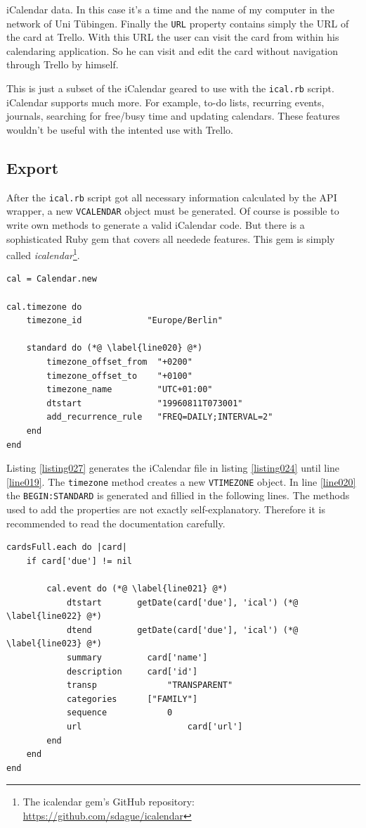 iCalendar data. In this case it's a time and the name of my computer in the network of Uni Tübingen. Finally the \lstinline{URL} property contains simply the URL of the card at Trello. With this URL the user can visit the card from within his calendaring application. So he can visit and edit the card without navigation through Trello by himself. \cite{ical:specs}

This is just a subset of the iCalendar geared to use with the \texttt{ical.rb} script. iCalendar supports much more. For example, to-do lists, recurring events, journals, searching for free/busy time and updating calendars. These features wouldn't be useful with the intented use with Trello. 

\subsection{Export}

After the \texttt{ical.rb} script got all necessary information calculated by the API wrapper, a new \lstinline{VCALENDAR} object must be generated. Of course is possible to write own methods to generate a valid iCalendar code. But there is a sophisticated Ruby gem that covers all needede features. This gem is simply called \emph{icalendar}\footnote{The icalendar gem's GitHub repository: \url{https://github.com/sdague/icalendar}}.

\begin{lstlisting}[aboveskip=1\baselineskip, caption=Generating a new \lstinline{VCALENDAR}., label=listing027]
cal = Calendar.new

cal.timezone do
	timezone_id             "Europe/Berlin"
	
	standard do (*@ \label{line020} @*)
		timezone_offset_from  "+0200"
		timezone_offset_to    "+0100"
		timezone_name         "UTC+01:00"
		dtstart               "19960811T073001"
		add_recurrence_rule   "FREQ=DAILY;INTERVAL=2"
	end
end
\end{lstlisting}

Listing \ref{listing027} generates the iCalendar file in listing \ref{listing024} until line \ref{line019}. The \lstinline{timezone} method creates a new \lstinline{VTIMEZONE} object. In line \ref{line020} the \lstinline{BEGIN:STANDARD} is generated and fillied in the following lines. The methods used to add the properties ​​are not exactly self-explanatory. Therefore it is recommended to read the documentation carefully.

\begin{lstlisting}[aboveskip=1\baselineskip, style=bash, caption=Generating the \lstinline{VEVENT} object., label=listing027]
cardsFull.each do |card|
	if card['due'] != nil	
		
		cal.event do (*@ \label{line021} @*)
			dtstart       getDate(card['due'], 'ical') (*@ \label{line022} @*)
			dtend         getDate(card['due'], 'ical') (*@ \label{line023} @*)
			summary     	card['name']
			description 	card['id']
			transp				"TRANSPARENT"
			categories		["FAMILY"]
			sequence			0
			url						card['url']
		end		
	end
end
\end{lstlisting}


